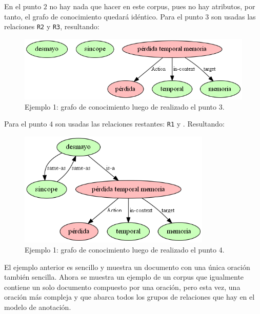 En el punto $2$ no hay nada que hacer en este corpus, pues no hay atributos, por tanto, el grafo de conocimiento quedará idéntico. Para el punto $3$ son usadas las relaciones \texttt{R2} y \texttt{R3}, resultando:
\begin{figure}[H]
	\begin{center}
		\includegraphics[width=4.7in]{graphics/knowledge_graph_example1_2.png}
		\caption[Ejemplo 1: grafo de conocimiento luego de realizado el punto 3]{Ejemplo 1: grafo de conocimiento luego de realizado el punto 3.}
		\label{fig:knowledge_graph1.2}
	\end{center}
\end{figure}

Para el punto $4$ son usadas las relaciones restantes: \texttt{R1} y \texttt{\textasteriskcentered}. Resultando:
\begin{figure}[H]
	\begin{center}
		\includegraphics[width=3.6in]{graphics/knowledge_graph_example1_3.png}
		\caption[Ejemplo 1: grafo de conocimiento luego de realizado el punto 4]{Ejemplo 1: grafo de conocimiento luego de realizado el punto 4.}
		\label{fig:knowledge_graph1.3}
	\end{center}
\end{figure}

El ejemplo anterior es sencillo y muestra un documento con una única oración también sencilla. Ahora se muestra un ejemplo de un corpus que igualmente contiene un solo documento compuesto por una oración, pero esta vez, una oración más compleja y que abarca todos los grupos de relaciones que hay en el modelo de anotación.

